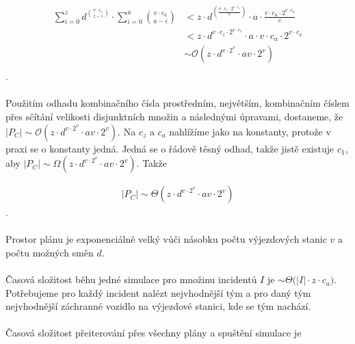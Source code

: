\begin{align*}
  \sum_{i=0}^{z}{d^{v \cdot c_z \choose z - i}} \cdot \sum_{i = 0}^{a}{v \cdot c_a \choose a - i}
  &< z \cdot d^{\left( \frac{v \cdot c_z \cdot 2^{v \cdot c_z}}{e} \right)} \cdot a \cdot {\frac{v \cdot c_a \cdot 2^{v \cdot c_a}}{e}}\\
  &< z \cdot d^{v \cdot c_z \cdot 2^{v \cdot c_z}} \cdot a \cdot {v \cdot c_a \cdot 2^{v \cdot c_a}}\\
  &\sim \mathcal{O}(z \cdot d^{v \cdot 2^v} \cdot av \cdot 2^v)\\
\end{align*}
.
\\
\\
Použitím odhadu kombinačního čísla prostředním, největším, kombinačním číslem přes sčítání velikosti disjunktních množin a následnými úpravami,
dostaneme, že $|P_C| \sim \mathcal{O}(z \cdot d^{v \cdot 2^v} \cdot av \cdot 2^v)$.
Na $c_z$ a $c_a$ nahlížíme jako na konstanty, protože v praxi se o konstanty jedná. Jedná se o řádově těsný odhad, takže jistě existuje $c_1$, aby $|P_C| \sim \Omega(z \cdot d^{v \cdot 2^v} \cdot av \cdot 2^v)$.
Takže 

\begin{align*}
  |P_C| \sim \Theta{(z \cdot d^{v \cdot 2^v} \cdot av \cdot 2^v)}
\end{align*}
.
\\
\\
Prostor plánu je exponenciálně velký vůči násobku počtu výjezdových stanic $v$ a počtu možných směn $d$.
\\
\\
Časová složitost běhu jedné simulace pro množinu incidentů $I$ je $\sim \Theta{(|I| \cdot z \cdot c_a})$.
Potřebujeme pro každý incident nalézt nejvhodnější tým a pro daný tým nejvhodnější záchranné vozidlo na výjezdové stanici, kde se tým nachází.
\\
\\
Časová složitost přeiterování přes všechny plány a spuštění simulace je

